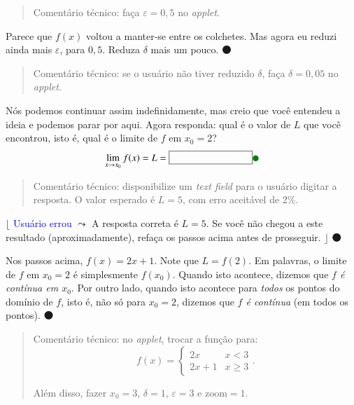 \documentclass[fleqn,12pt]{scrartcl}
\newenvironment{ct}{\begin{quotation}\color{red!30!black}\sffamily\small Comentário técnico: }{\end{quotation}} %
\newcommand\foreign[1]{\textsl{#1}}
\newcommand\proceed{\textcolor{green!50!black}{$\medbullet$}\xspace}
\newcommand\condicional[2]{$\lfloor$%
	\textsf{\textcolor{blue}{{\footnotesize #1}}}
	$\leadsto$ #2%
	$\rfloor$}
\newcommand\answerfield{\framebox[3cm]{\phantom{A}}}
\begin{document}
    \begin{ct}
	faça $\varepsilon = 0,5$ no \foreign{applet}.
    \end{ct}

    Parece que $f(x)$ voltou a manter-se entre os colchetes. Mas agora eu reduzi ainda mais $\varepsilon$, para $0,5$. Reduza $\delta$ mais um pouco. \proceed

    \begin{ct}
	se o usuário não tiver reduzido $\delta$, faça $\delta = 0,05$ no \foreign{applet}.
    \end{ct}

    Nós podemos continuar assim indefinidamente, mas creio que você entendeu a ideia e podemos parar por aqui. Agora responda: qual é o valor de $L$ que você encontrou, isto é, qual é o limite de $f$ em $x_0 = 2$?
    \begin{equation*}
	\lim_{x \to x_0} f(x) = L = \text{\answerfield \proceed}
    \end{equation*}

    \begin{ct}
	disponibilize um \foreign{text field} para o usuário digitar a resposta. O valor esperado é $L = 5$, com erro aceitável de 2\%.
    \end{ct}

    \condicional{Usuário errou}{A resposta correta é $L = 5$. Se você não chegou a este resultado (aproximadamente), refaça os passos acima antes de prosseguir.} \proceed

    Nos passos acima, $f(x) = 2x + 1$. Note que $L = f(2)$. Em palavras, o limite de $f$ em $x_0 = 2$ é simplesmente $f(x_0)$. Quando isto acontece, dizemos que \emph{$f$ é contínua em $x_0$}. Por outro lado, quando isto acontece para \emph{todos} os pontos do domínio de $f$, isto é, não só para $x_0 = 2$, dizemos que \emph{$f$ é contínua} (em todos os pontos). \proceed

    \begin{ct}
	no \foreign{applet}, trocar a função para:
	\begin{equation*}   
	    f(x) = \begin{cases}
		2x & x < 3 \\
		2x + 1 & x \ge 3
	    \end{cases}.
	\end{equation*}

	Além disso, fazer $x_0 = 3$, $\delta = 1$, $\varepsilon = 3$ e $\text{zoom} = 1$.
    \end{ct}
\end{document}
